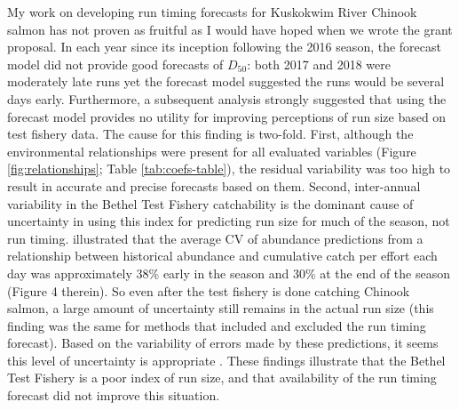 \documentclass[12pt,]{book}
\theoremstyle{definition}
\theoremstyle{definition}
\theoremstyle{definition}
\theoremstyle{remark}
\begin{document}
\noindent
My work on developing run timing forecasts for Kuskokwim River Chinook
salmon has not proven as fruitful as I would have hoped when we wrote
the grant proposal. In each year since its inception following the 2016
season, the forecast model did not provide good forecasts of \(D_{50}\):
both 2017 and 2018 were moderately late runs yet the forecast model
suggested the runs would be several days early. Furthermore, a
subsequent analysis \citep{staton-catalano-2019} strongly suggested that
using the forecast model provides no utility for improving perceptions
of run size based on test fishery data. The cause for this finding is
two-fold. First, although the environmental relationships were present
for all evaluated variables (Figure \ref{fig:relationships}; Table
\ref{tab:coefs-table}), the residual variability was too high to result
in accurate and precise forecasts based on them. Second, inter-annual
variability in the Bethel Test Fishery catchability
\citep[\emph{i}.\emph{e}., the fraction of total run captured; the
inverse is commonly referred to as
``run-per-index'';][]{flynn-hilborn-2004} is the dominant cause of
uncertainty in using this index for predicting run size for much of the
season, not run timing. \citet{staton-catalano-2019} illustrated that
the average CV of abundance predictions from a relationship between
historical abundance and cumulative catch per effort each day was
approximately 38\% early in the season and 30\% at the end of the season
(Figure 4 therein). So even after the test fishery is done catching
Chinook salmon, a large amount of uncertainty still remains in the
actual run size (this finding was the same for methods that included and
excluded the run timing forecast). Based on the variability of errors
made by these predictions, it seems this level of uncertainty is
appropriate \citep[also shown in Figure 4 of][]{staton-catalano-2019}.
These findings illustrate that the Bethel Test Fishery is a poor index
of run size, and that availability of the run timing forecast did not
improve this situation.
\end{document}
